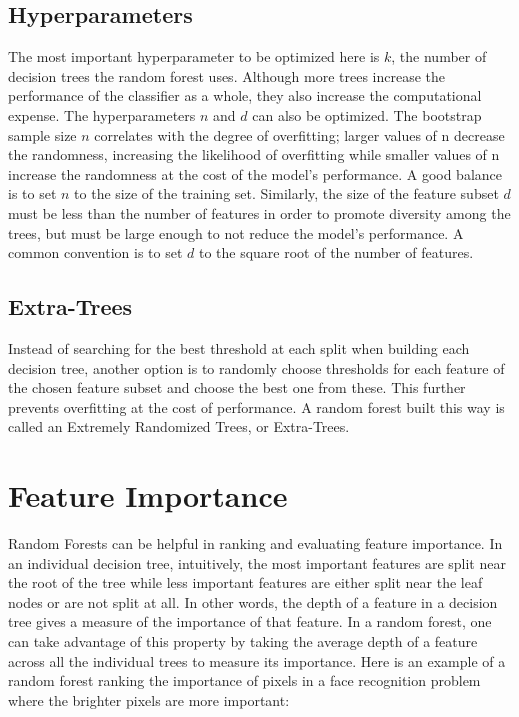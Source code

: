 \documentclass{article}
\begin{document}
\subsection{Hyperparameters}
The most important hyperparameter to be optimized here is $k$, the number of decision trees the random forest uses. Although more trees increase the performance of the classifier as a whole, they also increase the computational expense. The hyperparameters $n$ and $d$ can also be optimized. The bootstrap sample size $n$ correlates with the degree of overfitting; larger values of n decrease the randomness, increasing the likelihood of overfitting while smaller values of n increase the randomness at the cost of the model's performance. A good balance is to set $n$ to the size of the training set. Similarly, the size of the feature subset $d$ must be less than the number of features in order to promote diversity among the trees, but must be large enough to not reduce the model's performance. A common convention is to set $d$ to the square root of the number of features. 

\subsection{Extra-Trees}
Instead of searching for the best threshold at each split when building each decision tree, another option is to randomly choose thresholds for each feature of the chosen feature subset and choose the best one from these. This further prevents overfitting at the cost of performance. A random forest built this way is called an Extremely Randomized Trees, or Extra-Trees.

\section{Feature Importance}
Random Forests can be helpful in ranking and evaluating feature importance. In an individual decision tree, intuitively, the most important features are split near the root of the tree while less important features are either split near the leaf nodes or are not split at all. In other words, the depth of a feature in a decision tree gives a measure of the importance of that feature. In a random forest, one can take advantage of this property by taking the average depth of a feature across all the individual trees to measure its importance. 
Here is an example of a random forest ranking the importance of pixels in a face recognition problem where the brighter pixels are more important:
\end{document}

